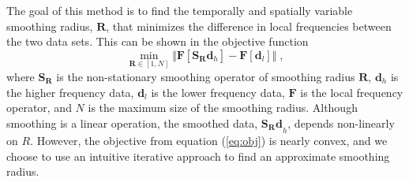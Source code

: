         The goal of this method is to find the temporally and spatially variable smoothing radius, $\mathbf{R}$, that minimizes the difference in local frequencies between the two data sets. 
        This can be shown in the objective function
        \begin{equation}
                \label{eq:obj}
                \min_{\mathbf{R} \in [1,N]} \Big \Vert \mathbf{F}[ \mathbf{S}_{\mathbf{R}} \mathbf{d}_h ] - 
                \mathbf{F}[ \mathbf{d}_l] \Big \Vert\;,
        \end{equation}
        where $\mathbf{S}_\mathbf{R}$ is the non-stationary smoothing operator of smoothing radius $\mathbf{R}$, $\mathbf{d}_h$ is the higher frequency data, $\mathbf{d}_l$ is the lower frequency data, $\mathbf{F}$ is the local frequency operator, and $N$ is the maximum size of the smoothing radius.
        Although smoothing is a linear operation, the smoothed data, $\mathbf{S_R d}_h$, depends non-linearly on $R$. However, the objective from equation (\ref{eq:obj}) is nearly convex, and we choose to use an intuitive iterative approach to find an approximate smoothing radius.
                                
